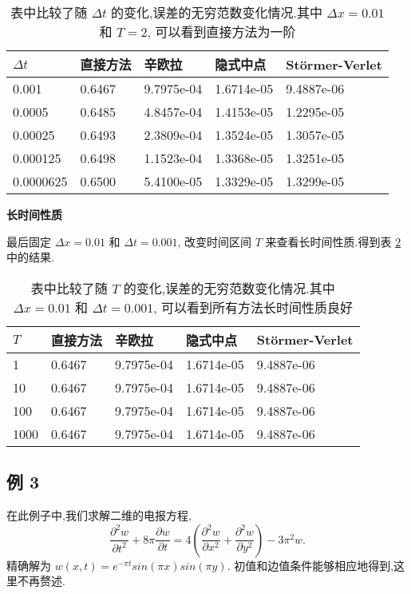 \begin{table}[h]
  \centering
\caption{表中比较了随 $\Delta t$ 的变化,误差的无穷范数变化情况.其中 $\Delta x=0.01$ 和 $T=2$, 可以看到直接方法为一阶}
\begin{tabularx}{\linewidth}{XXXXX}
 \toprule[1.5pt]
 $\Delta t$ &直接方法 & 辛欧拉 & 隐式中点 & St\"{o}rmer-Verlet\\
 \midrule[1pt]
 0.001 & 0.6467 & 9.7975e-04 & 1.6714e-05 & 9.4887e-06 \\
 0.0005 & 0.6485 & 4.8457e-04 & 1.4153e-05 & 1.2295e-05 \\
 0.00025 & 0.6493 & 2.3809e-04 & 1.3524e-05 & 1.3057e-05 \\
 0.000125 & 0.6498 & 1.1523e-04 & 1.3368e-05 & 1.3251e-05 \\
 0.0000625 & 0.6500 & 5.4100e-05 & 1.3329e-05 & 1.3299e-05 \\
 \bottomrule[1.5pt]
\end{tabularx}
  \label{tab:dt2}
\end{table}

\textbf{长时间性质}

最后固定 $\Delta x = 0.01$ 和 $\Delta t = 0.001$, 改变时间区间 $T$ 来查看长时间性质.得到表 \ref{tab:t2} 中的结果.

\begin{table}[h]
  \centering
\caption{表中比较了随 $T$ 的变化,误差的无穷范数变化情况.其中 $\Delta x=0.01$ 和 $\Delta t=0.001$, 可以看到所有方法长时间性质良好}
\begin{tabularx}{\linewidth}{XXXXX}
 \toprule[1.5pt]
 $T$ &直接方法 & 辛欧拉 & 隐式中点 & St\"{o}rmer-Verlet\\
 \midrule[1pt]
 1 & 0.6467 & 9.7975e-04 & 1.6714e-05 & 9.4887e-06 \\
 10 & 0.6467 & 9.7975e-04 & 1.6714e-05 & 9.4887e-06 \\
 100 & 0.6467 & 9.7975e-04 & 1.6714e-05 & 9.4887e-06 \\
 1000 & 0.6467 & 9.7975e-04 & 1.6714e-05 & 9.4887e-06 \\
 \bottomrule[1.5pt]
\end{tabularx}
  \label{tab:t2}
\end{table}

\subsection*{例 3}
在此例子中,我们求解二维的电报方程,
\begin{equation*}
\frac{\partial ^2 w}{\partial t^2}+8\pi \frac{\partial w}{\partial
t}=4 (\frac{\partial ^2 w}{\partial x^2} + \frac{\partial ^2
w}{\partial y^2}) -3\pi^2 w.
\end{equation*}
精确解为 $w(x,t) = e^{-\pi t}sin(\pi x)sin(\pi y)$. 初值和边值条件能够相应地得到,这里不再赘述.

